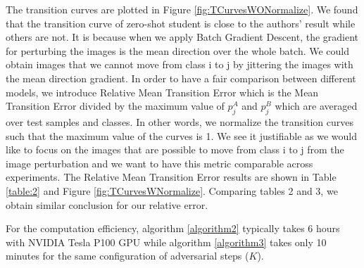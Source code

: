 \documentclass{article}
\begin{document}
The transition curves are plotted in Figure \ref{fig:TCurvesWONormalize}.
We found that the transition curve of zero-shot student is close to the authors' result while others are not. It is because when we apply Batch Gradient Descent, the gradient for perturbing the images is the mean direction over the whole batch. We could obtain images that we cannot move from class i to j by jittering the images with the mean direction gradient. In order to have a fair comparison between different models, we introduce Relative Mean Transition Error which is the Mean Transition Error divided by the maximum value of $p^{A}_j$ and $p^{B}_j$ which are averaged over test samples and classes. In other words, we normalize the transition curves such that the maximum value of the curves is 1. We see it justifiable as we would like to focus on the images that are possible to move from class i to j from the image perturbation and we want to have this metric comparable across experiments. The Relative Mean Transition Error results are shown in Table \ref{table:2} and Figure \ref{fig:TCurvesWNormalize}. Comparing tables 2 and 3, we obtain similar conclusion for our relative error.

For the computation efficiency, algorithm \ref{algorithm2} typically takes 6 hours with NVIDIA Tesla P100 GPU while algorithm \ref{algorithm3} takes only 10 minutes for the same configuration of adversarial steps ($K$).
\end{document}
